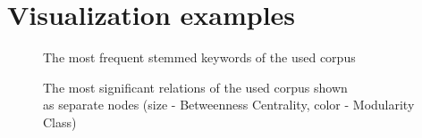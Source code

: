 \documentclass[]{article}
\begin{document}
\clearpage
\appendix
\appendixpage

\renewcommand\thefigure{\thesection.\arabic{figure}} 

%
\section{Visualization examples}
%
\setcounter{figure}{0}

\begin{figure}[htbp]
  \centering
    \caption{The most frequent stemmed keywords of the used corpus}
  \label{Cloud}
\end{figure}
\begin{figure}[htbp]
  \centering
    \captionsetup{justification=centering}
    \caption{The most significant relations of the used corpus shown \\ as separate nodes (size - Betweenness Centrality, color - Modularity Class)}
  \label{AllRelations}
\end{figure}
\end{document}
